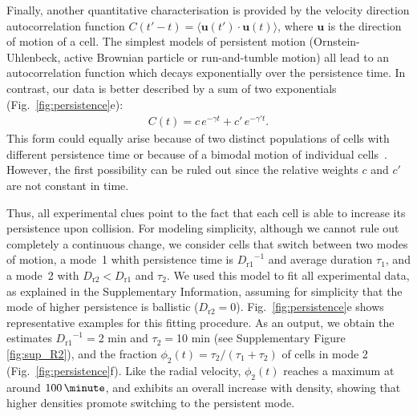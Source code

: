 \documentclass[11pt, twocolumn]{article}
\newcommand\rev[1]{{#1}}
\newcommand{\Dru}{{D_{\mathrm{r1}}}}
\newcommand{\Drd}{{D_{\mathrm{r2}}}}
\newcommand{\tauu}{\tau_1}
\newcommand{\taud}{\tau_2}
\newcommand{\be}{\begin{eqnarray}}
\newcommand{\ee}{\end{eqnarray}}
\newcommand{\vc}[1]{\mathbf{#1}}
\newcommand{\vcu}{\vc{u}}
\newcommand{\C}{C}
\begin{document}
Finally, another quantitative characterisation is provided by the
velocity direction autocorrelation function
$C(t'-t)=\langle \vcu(t')\cdot \vcu(t)\rangle$, where $\vcu$ is the direction of
motion of a cell. The simplest models of persistent motion
(Ornstein-Uhlenbeck, active Brownian particle or run-and-tumble
motion) all lead to an autocorrelation function which decays
exponentially over the persistence time. In contrast, our data is
better described by a sum of two exponentials
(Fig.~\ref{fig:persistence}e): \be \C(t) = c\, e^{-\gamma
    t} + c'\, e^{-\gamma' t}.
\label{eq:corr_biexp}
\ee  This form could equally arise because of two distinct
populations of cells with different persistence time or because of a
bimodal motion of individual
cells~\cite{Potdar2010,Maiuri2015,Metzner2015}.  \rev{However,
  the first possibility can be ruled out since the relative weights
  $c$ and $c'$ are not constant in time. }

  Thus, all experimental clues point to the fact that each cell is
  able to increase its persistence upon collision. For modeling
  simplicity, although we cannot rule out completely a continuous
  change, we consider cells that switch between two modes of motion, a
  mode~1 whith persistence time is $\Dru^{-1}$ and average duration
  $\tauu$, and a mode~2 with $\Drd < \Dru$ and $\taud$. We used this
  model to fit all experimental data, as explained in the
  Supplementary Information, assuming for simplicity that the mode of
  higher persistence is ballistic
  ($\Drd=0$). Fig.~\ref{fig:persistence}e shows representative
  examples for this fitting procedure.  As an output, we obtain the
  estimates $\Dru^{-1}=$2 min and $\taud=$10 min (see Supplementary
  Figure \ref{fig:sup_R2}), and the fraction
  $\phi_2(t)=\tau_2/\left(\tau_1+\tau_2\right)$
  of cells in mode 2
  (Fig.~\ref{fig:persistence}f). Like the radial velocity, $\phi_2(t)$
  reaches a maximum at around $100\,\minute$, and exhibits an overall
  increase with density, showing that higher densities promote
  switching to the persistent mode.
\end{document}
